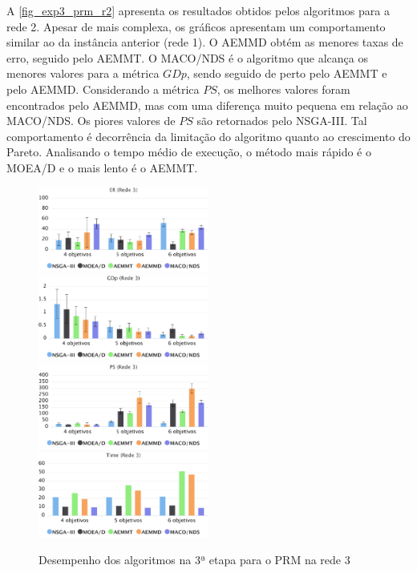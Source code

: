 A \autoref{fig_exp3_prm_r2} apresenta os resultados obtidos pelos algoritmos para a rede 2. Apesar de mais complexa, os gráficos apresentam um comportamento similar ao da instância anterior (rede 1). O AEMMD obtém as menores taxas de erro, seguido pelo AEMMT. O MACO/NDS é o algoritmo que alcança os menores valores para a métrica $GDp$, sendo seguido de perto pelo AEMMT e pelo AEMMD. Considerando a métrica $PS$, os melhores valores foram encontrados pelo AEMMD, mas com uma diferença muito pequena em relação ao MACO/NDS. Os piores valores de $PS$ são retornados pelo NSGA-III. Tal comportamento é decorrência da limitação do algoritmo quanto ao crescimento do Pareto. Analisando o tempo médio de execução, o método mais rápido é o MOEA/D e o mais lento é o AEMMT.

\begin{figure}[!htbp]
	\includegraphics[width=0.5\textwidth]{cap_experimentos/figs/etapa3/er-mrp-r3}
	\includegraphics[width=0.5\textwidth]{cap_experimentos/figs/etapa3/gd-mrp-r3}
	\includegraphics[width=0.5\textwidth]{cap_experimentos/figs/etapa3/ps-mrp-r3}
	\includegraphics[width=0.5\textwidth]{cap_experimentos/figs/etapa3/time-mrp-r3}
	\caption{\label{fig_exp3_prm_r3}Desempenho dos algoritmos na 3ª etapa para o PRM na rede 3}
\end{figure}

